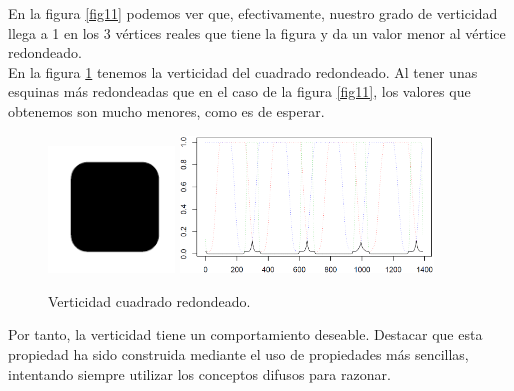 En la figura \ref{fig11} podemos ver que, efectivamente, nuestro grado de verticidad llega a 1 en los 3 vértices reales que tiene la figura y da un valor menor al vértice redondeado.\\

En la figura \ref{fig12} tenemos la verticidad del cuadrado redondeado. Al tener unas esquinas más redondeadas que en el caso de la figura \ref{fig11}, los valores que obtenemos son mucho menores, como es de esperar.\\

\begin{figure}[H]
\begin{center}

\includegraphics[width=0.3\textwidth]{img/device3-1.png} \hfill \includegraphics[width=0.6\textwidth]{img/vert-dev3-1-limpio.png}
\end{center}

\caption{Verticidad cuadrado redondeado.}
\label{fig12}
\end{figure}

Por tanto, la verticidad tiene un comportamiento deseable. Destacar que esta propiedad ha sido construida mediante el uso de propiedades más sencillas, intentando siempre utilizar los conceptos difusos para razonar.\\
